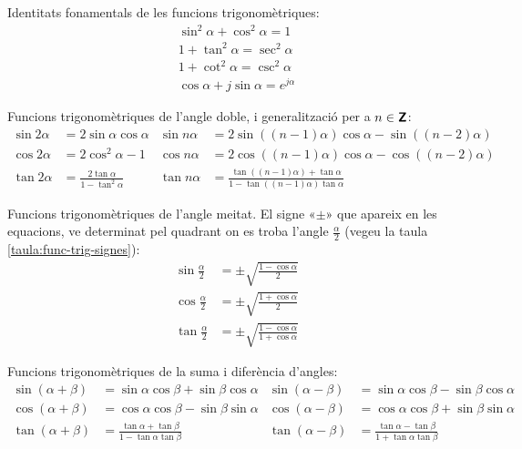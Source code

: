 Identitats fonamentals de les funcions trigonomètriques:
\begin{gather}
    \sin^2\alpha + \cos^2\alpha = 1 \\
    1 + \tan^2\alpha = \sec^2\alpha\\
    1 + \cot^2\alpha = \csc^2\alpha\\
    \cos\alpha + j \sin\alpha = e^{j\alpha}
\end{gather}

Funcions trigonomètriques de l'angle doble, i generalització per a
$n\in{\ensuremath{\boldsymbol{\mathsf{Z}}}}$:
\begin{subequations}
\begin{align}
    \sin 2\alpha &= 2 \sin\alpha \cos\alpha & \sin n \alpha &=
    2\sin((n-1)\alpha)\cos \alpha -\sin((n-2)\alpha)\\[1ex]
    \cos 2\alpha &= 2\cos^2\alpha -1 & \cos n\alpha &=
    2\cos((n-1)\alpha)\cos \alpha -\cos((n-2)\alpha)\\[1ex]
    \tan 2\alpha &=\frac{2\tan\alpha}{1-\tan^2\alpha} & \tan n
    \alpha &= \frac{\tan((n-1)\alpha)+\tan\alpha}{1-\tan((n-1)\alpha)\tan\alpha}
\end{align}
\end{subequations}


Funcions trigonomètriques de l'angle meitat. El signe «$\pm$» que
apareix en les equacions, ve determinat pel quadrant on es troba
l'angle $\frac{\alpha}{2}$ (vegeu la taula
\vref{taula:func-trig-signes}):
\begin{subequations}
\begin{align}
    \sin \frac{\alpha}{2} &= \pm \sqrt{\frac{1-\cos\alpha}{2}}\\[1ex]
    \cos \frac{\alpha}{2} &= \pm \sqrt{\frac{1+\cos\alpha}{2}}\\[1ex]
    \tan \frac{\alpha}{2} &= \pm \sqrt{\frac{1-\cos\alpha}{1+\cos\alpha}}
\end{align}
\end{subequations}


Funcions trigonomètriques de la suma i diferència d'angles:
\begin{subequations}
\begin{align}
    \sin(\alpha+\beta) &= \sin\alpha \cos\beta + \sin\beta\cos\alpha &
    \sin(\alpha-\beta) &= \sin\alpha \cos\beta - \sin\beta\cos\alpha\\[1ex]
    \cos(\alpha+\beta) &= \cos\alpha \cos\beta - \sin\beta\sin\alpha &
    \cos(\alpha-\beta) &= \cos\alpha \cos\beta + \sin\beta\sin\alpha\label{eq:cos-a-b}\\[1ex]
    \tan(\alpha+\beta) &=\frac{\tan\alpha+\tan\beta}{1-\tan\alpha\tan\beta} &
    \tan(\alpha-\beta)
    &=\frac{\tan\alpha-\tan\beta}{1+\tan\alpha\tan\beta}
\end{align}
\end{subequations}

